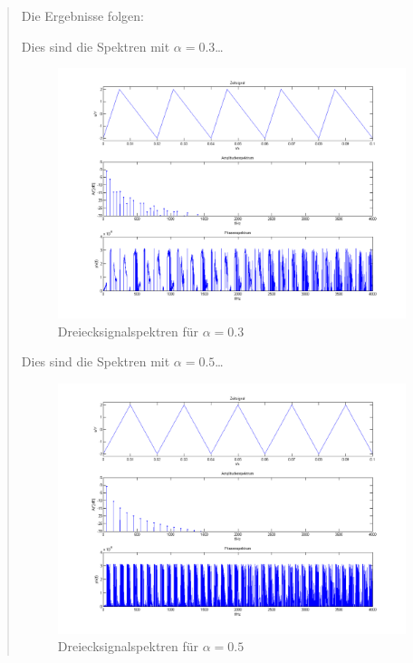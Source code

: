 \begin{quote}
		
		\vspace{1em}
		
		
		
 Die Ergebnisse folgen:
			
		Dies sind die Spektren mit $\alpha = 0.3$\ldots
			
		\begin{center}
	    
	           \begin{figure}[H]
    			\centering
    				\includegraphics[scale=0.5]{drei_alpha3.png}
    			\caption{Dreiecksignalspektren für $\alpha = 0.3$}
    			\end{figure}		
		
		\end{center}
		
		
		
		\vspace{1em}
		
		Dies sind die Spektren mit $\alpha = 0.5$\ldots
		
		\begin{center}
	    
	           \begin{figure}[H]
    			\centering
    				\includegraphics[scale=0.5]{drei_alpha5.png}
    			\caption{Dreiecksignalspektren für $\alpha = 0.5$}
    			\end{figure}		
		

\end{center}
\end{quote}

